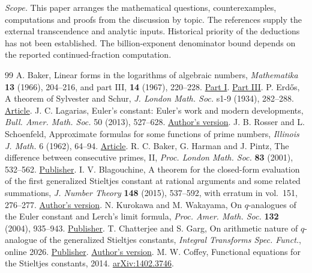 \documentclass[11pt,a4paper]{article}
\theoremstyle{definition}\newtheorem{definition}[theorem]{Definition}\newtheorem{example}[theorem]{Example}
\theoremstyle{remark}\newtheorem{remark}[theorem]{Remark}
\begin{document}
\noindent\textit{Scope.} This paper arranges the mathematical questions, counterexamples, computations and proofs from the discussion by topic. The references supply the external transcendence and analytic inputs. Historical priority of the deductions has not been established. The billion-exponent denominator bound depends on the reported continued-fraction computation.

\begin{thebibliography}{99}
 A. Baker, Linear forms in the logarithms of algebraic numbers, \emph{Mathematika} \textbf{13} (1966), 204--216, and part III, \textbf{14} (1967), 220--228.
\href{https://doi.org/10.1112/S0025579300003971}{Part I}.
\href{https://doi.org/10.1112/S0025579300003843}{Part III}.
 P. Erd\H{o}s, A theorem of Sylvester and Schur, \emph{J. London Math. Soc.} s1-9 (1934), 282--288. \href{https://doi.org/10.1112/jlms/s1-9.4.282}{Article}.
 J. C. Lagarias, Euler's constant: Euler's work and modern developments, \emph{Bull. Amer. Math. Soc.} 50 (2013), 527--628. \href{https://arxiv.org/abs/1303.1856}{Author's version}.
 J. B. Rosser and L. Schoenfeld, Approximate formulas for some functions of prime numbers, \emph{Illinois J. Math.} 6 (1962), 64--94. \href{https://doi.org/10.1215/ijm/1255631807}{Article}.
 R. C. Baker, G. Harman and J. Pintz, The difference between consecutive primes, II, \emph{Proc. London Math. Soc.} \textbf{83} (2001), 532--562. \href{https://doi.org/10.1112/plms/83.3.532}{Publisher}.
 I. V. Blagouchine, A theorem for the closed-form evaluation of the first generalized Stieltjes constant at rational arguments and some related summations, \emph{J. Number Theory} \textbf{148} (2015), 537--592, with erratum in vol.~151, 276--277. \href{https://arxiv.org/abs/1401.3724}{Author's version}.
 N. Kurokawa and M. Wakayama, On $q$-analogues of the Euler constant and Lerch's limit formula, \emph{Proc. Amer. Math. Soc.} \textbf{132} (2004), 935--943. \href{https://doi.org/10.1090/S0002-9939-03-07025-4}{Publisher}. T. Chatterjee and S. Garg, On arithmetic nature of $q$-analogue of the generalized Stieltjes constants, \emph{Integral Transforms Spec. Funct.}, online 2026. \href{https://doi.org/10.1080/10652469.2026.2650678}{Publisher}. \href{https://arxiv.org/abs/2404.08025}{Author's version}.
 M. W. Coffey, Functional equations for the Stieltjes constants, 2014. \href{https://arxiv.org/abs/1402.3746}{arXiv:1402.3746}.

\end{thebibliography}
\end{document}
